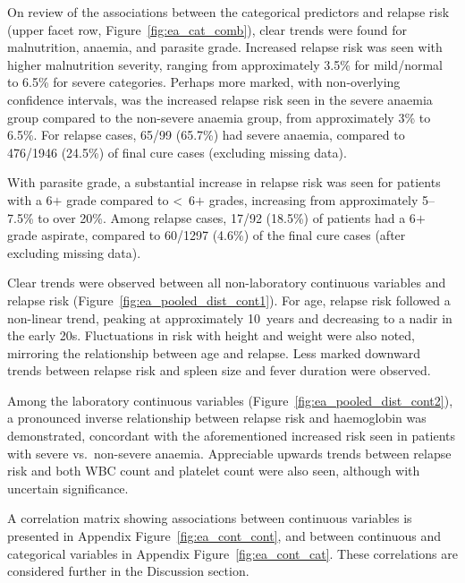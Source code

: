 On review of the associations between the categorical predictors and relapse risk (upper facet row, Figure~\ref{fig:ea_cat_comb}), clear trends were found for malnutrition, anaemia, and parasite grade. Increased relapse risk was seen with higher malnutrition severity, ranging from approximately 3.5\% for mild/normal to 6.5\% for severe categories. Perhaps more marked, with non-overlying confidence intervals, was the increased relapse risk seen in the severe anaemia group compared to the non-severe anaemia group, from approximately 3\% to 6.5\%. For relapse cases, 65/99 (65.7\%) had severe anaemia, compared to 476/1946 (24.5\%) of final cure cases (excluding missing data).

With parasite grade, a substantial increase in relapse risk was seen for patients with a 6$+$ grade compared to <~6$+$ grades, increasing from approximately 5--7.5\% to over 20\%. Among relapse cases, 17/92 (18.5\%) of patients had a 6$+$ grade aspirate, compared to 60/1297 (4.6\%) of the final cure cases (after excluding missing data).

Clear trends were observed between all non-laboratory continuous variables and relapse risk (Figure~\ref{fig:ea_pooled_dist_cont1}). For age, relapse risk followed a non-linear trend, peaking at approximately 10~years and decreasing to a nadir in the early 20s. Fluctuations in risk with height and weight were also noted, mirroring the relationship between age and relapse. Less marked downward trends between relapse risk and spleen size and fever duration were observed.

Among the laboratory continuous variables (Figure~\ref{fig:ea_pooled_dist_cont2}), a pronounced inverse relationship between relapse risk and haemoglobin was demonstrated, concordant with the aforementioned increased risk seen in patients with severe vs.\ non-severe anaemia. Appreciable upwards trends between relapse risk and both WBC count and platelet count were also seen, although with uncertain significance.

A correlation matrix showing associations between continuous variables is presented in Appendix Figure~\ref{fig:ea_cont_cont}, and between continuous and categorical variables in Appendix Figure~\ref{fig:ea_cont_cat}. These correlations are considered further in the Discussion section.


